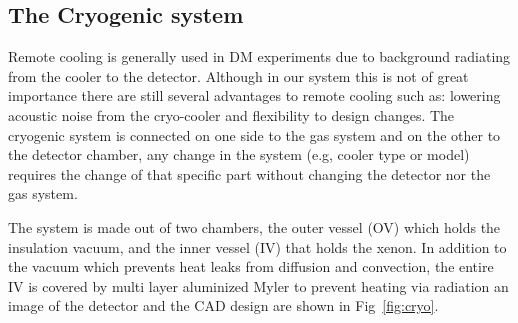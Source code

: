 \subsection{The Cryogenic system}
\label{subsec:cryo}

Remote cooling is generally used in DM experiments due to background radiating from the cooler to the detector. Although in our system 
this is not of great importance there are still several advantages to remote cooling such as: lowering acoustic noise from the cryo-cooler 
and flexibility to design changes. The cryogenic system is connected on one side to the gas system and on the other to the detector chamber, 
any change in the system (e.g, cooler type or model) requires the change of that specific part without changing the detector nor the gas system.

The system is made out of two chambers, the outer vessel (OV) which holds the insulation vacuum, and the inner vessel (IV) that holds the 
xenon. In addition to the vacuum which prevents heat leaks from diffusion and convection, the entire IV is covered by multi layer aluminized 
Myler to prevent heating via radiation an image of the detector and the CAD design are shown in Fig~\ref{fig:cryo}. 
